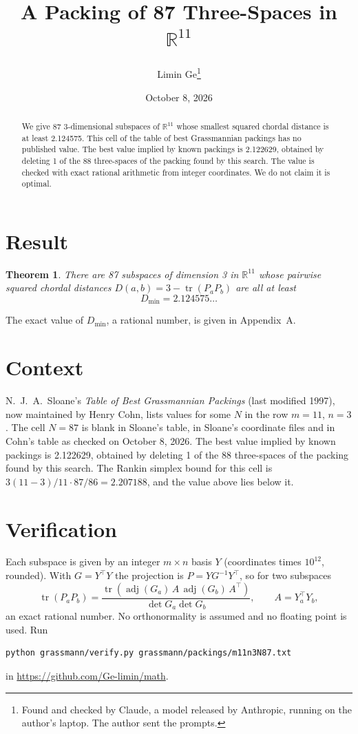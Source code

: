 \documentclass[11pt,a4paper]{article}
\title{A Packing of 87 Three-Spaces in $\mathbb{R}^{11}$}
\author{Limin Ge\thanks{Found and checked by Claude, a model released by Anthropic, running on the author's laptop. The author sent the prompts.}}
\date{October 8, 2026}
\newtheorem*{theorem}{Theorem}
\begin{document}
\maketitle
\begin{abstract}
We give 87 3-dimensional subspaces of $\mathbb{R}^{11}$ whose smallest squared chordal distance is at least 2.124575. This cell of the table of best Grassmannian packings has no published value. The best value implied by known packings is 2.122629, obtained by deleting 1 of the 88 three-spaces of the packing found by this search. The value is checked with exact rational arithmetic from integer coordinates. We do not claim it is optimal.
\end{abstract}

\section{Result}
\begin{theorem}
There are 87 subspaces of dimension 3 in $\mathbb{R}^{11}$ whose pairwise squared chordal distances $D(a,b) = 3 - \operatorname{tr}(P_aP_b)$ are all at least
\[ D_{\min} = 2.124575\ldots \]
\end{theorem}
The exact value of $D_{\min}$, a rational number, is given in Appendix~A.


\section{Context}
N.~J.~A.~Sloane's \emph{Table of Best Grassmannian Packings} (last modified 1997), now maintained by Henry Cohn, lists values for some $N$ in the row $m=11$, $n=3$. The cell $N=87$ is blank in Sloane's table, in Sloane's coordinate files and in Cohn's table as checked on October 8, 2026. The best value implied by known packings is 2.122629, obtained by deleting 1 of the 88 three-spaces of the packing found by this search. The Rankin simplex bound for this cell is $3(11-3)/11\cdot 87/86 = 2.207188$, and the value above lies below it.


\section{Verification}
Each subspace is given by an integer $m\times n$ basis $Y$ (coordinates times $10^{12}$, rounded). With $G=Y^\top Y$ the projection is $P=YG^{-1}Y^\top$, so for two subspaces
\[ \operatorname{tr}(P_aP_b)=\frac{\operatorname{tr}(\operatorname{adj}(G_a)\,A\,\operatorname{adj}(G_b)\,A^\top)}{\det G_a\det G_b},\qquad A=Y_a^\top Y_b, \]
an exact rational number. No orthonormality is assumed and no floating point is used. Run
\begin{verbatim}
python grassmann/verify.py grassmann/packings/m11n3N87.txt
\end{verbatim}
in \url{https://github.com/Ge-limin/math}.
\end{document}
